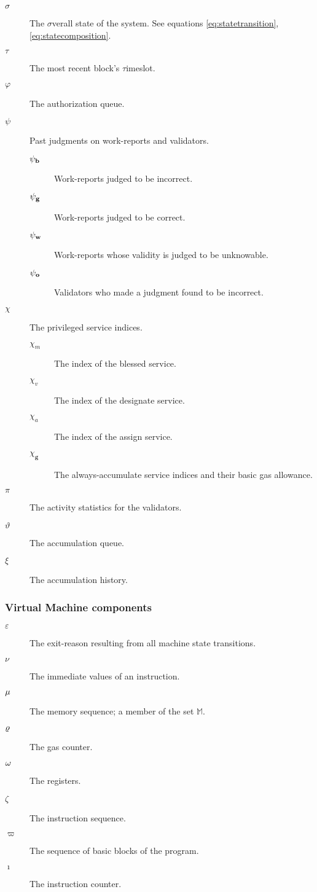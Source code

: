 \begin{description}
\begin{description}
  \end{description}
  \item[$\sigma$] The $\sigma$verall state of the system. See equations \ref{eq:statetransition}, \ref{eq:statecomposition}. %
  \item[$\tau$] The most recent block's $\tau$imeslot. %
  \item[$\varphi$] The authorization queue. %
  \item[$\psi$] Past judgments on work-reports and validators. %
  \begin{description}
    \item[$\psi_\mathbf{b}$] Work-reports judged to be incorrect.
    \item[$\psi_\mathbf{g}$] Work-reports judged to be correct.
    \item[$\psi_\mathbf{w}$] Work-reports whose validity is judged to be unknowable.
    \item[$\psi_\mathbf{o}$] Validators who made a judgment found to be incorrect.
  \end{description}
  \item[$\chi$] The privileged service indices. %
  \begin{description}
    \item[$\chi_m$] The index of the blessed service.
    \item[$\chi_v$] The index of the designate service.
    \item[$\chi_a$] The index of the assign service.
    \item[$\chi_\mathbf{g}$] The always-accumulate service indices and their basic gas allowance.
  \end{description}
  \item[$\pi$] The activity statistics for the validators. %
  \item[$\vartheta$] The accumulation queue. %
  \item[$\xi$] The accumulation history. %
\end{description}

\subsubsection{Virtual Machine components}

\begin{description}
  \item[$\varepsilon$] The exit-reason resulting from all machine state transitions. %
  \item[$\nu$] The immediate values of an instruction. %
  \item[$\mu$] The memory sequence; a member of the set $\mathbb{M}$. %
  \item[$\varrho$] The gas counter. %
  \item[$\omega$] The registers. %
  \item[$\zeta$] The instruction sequence. %
  \item[$\varpi$] The sequence of basic blocks of the program. %
  \item[$\imath$] The instruction counter. %
\end{description}

